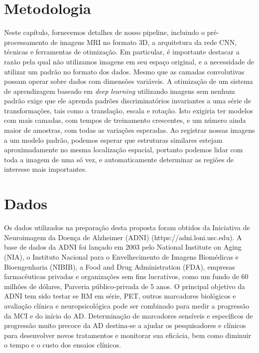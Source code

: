 \documentclass[openright]{UFRGS} %
\begin{document}
\section{Metodologia}
Neste capítulo, fornecemos detalhes de nosso pipeline, incluindo o pré-processamento de imagens MRI no formato 3D,
a arquitetura da rede CNN, técnicas e ferramentas de otimização. Em particular, é importante destacar a
razão pela qual não utilizamos imagens em seu espaço original, e a necessidade de utilizar um padrão no formato dos dados.
Mesmo que as camadas convolutivas possam operar sobre dados com dimensões variáveis.
A otimização de um sistema de aprendizagem baseado em  \textit{deep learning} utilizando imagens sem nenhum padrão exige que ele aprenda
padrões discriminatórios invariantes a uma série de transformações, tais como a translação,
escala e rotação. Isto exigiria ter modelos com mais camadas, com tempos de treinamento crescentes,
e um número ainda maior de amostras, com todas as variações esperadas. Ao registrar nossas
imagens a um modelo padrão, podemos esperar que estruturas similares estejam aproximadamente no
mesma localização espacial, portanto podemos lidar com toda a imagem de uma só vez, e automaticamente
determinar as regiões de interesse mais importantes.


\section{Dados}

Os dados utilizados na preparação desta proposta foram obtidos da Iniciativa de Neuroimagem da Doença de Alzheimer (ADNI) (https://adni.loni.usc.edu). A base de dados da ADNI
foi lançado em 2003 pelo National Institute on Aging (NIA), o Instituto Nacional para o Envelhecimento
de Imagens Biomédicas e Bioengenharia (NIBIB), a Food and Drug Administration
(FDA), empresas farmacêuticas privadas e organizações sem fins lucrativos, como um fundo de 60 milhões de dólares,
Parceria público-privada de 5 anos. O principal objetivo da ADNI tem sido testar se
RM em série, PET, outros marcadores biológicos e avaliação clínica e neuropsicológica
pode ser combinado para medir a progressão da MCI e do início do AD. Determinação de
marcadores sensíveis e específicos de progressão muito precoce da AD destina-se a ajudar os pesquisadores
e clínicos para desenvolver novos tratamentos e monitorar sua eficácia, bem como diminuir
o tempo e o custo dos ensaios clínicos.
\end{document}

